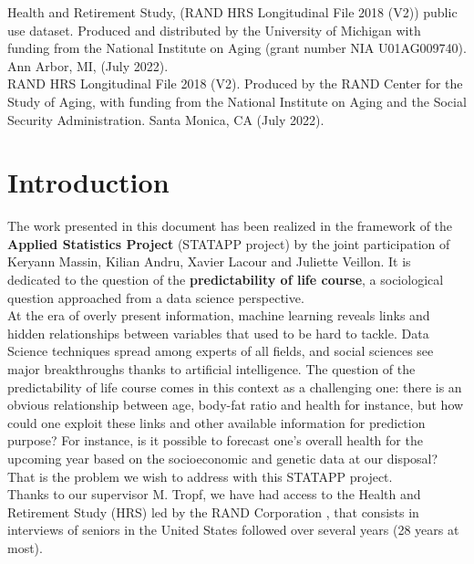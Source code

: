 \documentclass[]{article}
\begin{document}
Health and Retirement Study, (RAND HRS Longitudinal File 2018 (V2)) public use dataset. Produced
and distributed by the University of Michigan with funding from the National Institute on Aging (grant number
NIA U01AG009740). Ann Arbor, MI, (July 2022). \\

RAND HRS Longitudinal File 2018 (V2). Produced by the RAND Center for the Study of Aging, with
funding from the National Institute on Aging and the Social Security Administration. Santa Monica, CA (July
2022).

\newpage
\tableofcontents
\thispagestyle{empty}
\newpage
\section{Introduction}
The work presented in this document has been realized in the framework of the \textbf{Applied Statistics Project} (STATAPP project) by the joint participation of Keryann Massin, Kilian Andru, Xavier Lacour and Juliette Veillon. It is dedicated to the question of the \textbf{predictability of life course}, a sociological question approached from a data science perspective.\\

\noindent
At the era of overly present information, machine learning reveals links and hidden relationships between variables that used to be hard to tackle. Data Science techniques spread among experts of all fields, and social sciences see major breakthroughs thanks to artificial intelligence. The question of the predictability of life course comes in this context as a challenging one: there is an obvious relationship between age, body-fat ratio and health for instance, but how could one exploit these links and other available information for prediction purpose? For instance, is it possible to forecast one's overall health for the upcoming year based on the socioeconomic and genetic data at our disposal? That is the problem we wish to address with this STATAPP project.\\

\noindent
Thanks to our supervisor M. Tropf, we have had access to the Health and Retirement Study (HRS) led by the RAND Corporation \cite{hrs2014}, that consists in interviews of seniors in the United States followed over several years (28 years at most).\\
\end{document}

